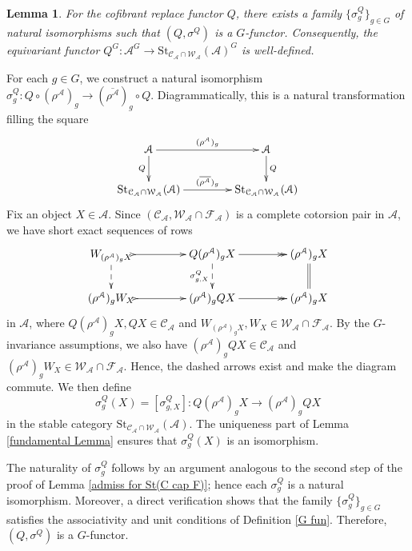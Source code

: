 \documentclass[12pt,twoside]{amsart}
\theoremstyle{bfupright head,slanted body}
\theoremstyle{bfupright head,upright body}
\theoremstyle{fixed bf head,slanted body}
\newtheorem{lem}[res]{Lemma}            \newtheorem*{lem*}{Lemma}
\theoremstyle{fixed bf head,upright body}
\theoremstyle{numbered paragraph}
\newenvironment{prf*}[1][Proof]{%
  \begin{proof}[\bf #1]
    \setcounter{equation}{0}
    \renewcommand{\theequation}{\arabic{equation}}}
  {\end{proof}
}
\numberwithin{equation}{res}
\newcommand{\calC}{\mathcal{C}}
\newcommand{\calW}{\mathcal{W}}
\newcommand{\calF}{\mathcal{F}}
\newcommand{\calA}{\mathcal{A}}
\newcommand{\St}{\mathrm{St}}
\begin{document}
\begin{lem} \label{G-functor Q}
For the cofibrant replace functor $Q$, there exists a family \(\{\sigma_g^Q\}_{g\in G}\) of natural isomorphisms such that \((Q,\sigma^Q)\) is a \(G\)-functor. Consequently, the equivariant functor
\(
Q^G:\calA^G \rightarrow \St_{\calC_\calA \cap \calW_\calA}(\calA)^G
\)
is well-defined.
\end{lem}

\begin{prf*}
For each \(g\in G\), we construct a natural isomorphism
\(
\sigma^Q_g : Q\circ(\rho^\calA)_g \rightarrow (\overline{\rho^\calA})_g\circ Q.
\)
Diagrammatically, this is a natural transformation filling the square
\[
\xymatrix@C=1.5CM@R=0.75CM{
   \calA
\ar[d]_-{Q}
\ar[r]^-{(\rho^\calA)_g}
&  \calA
\ar[d]^-{Q}             \\
   \St_{\calC_\calA \cap \calW_\calA}(\calA)
\ar[r]^-{(\overline{\rho^\calA})_g}
&  \St_{\calC_\calA \cap \calW_\calA}(\calA)                         }
\]
Fix an object $X \in \calA$.
Since $(\calC_\calA, \calW_\calA \cap \calF_\calA)$ is a complete cotorsion pair in $\calA$, we have short exact sequences of rows
\[
\xymatrix@C=1.5CM@R=0.75CM{
   W_{(\rho^\calA)_g X}
\ar@{-->}[d]
\ar@{>->}[r]
&  Q(\rho^\calA)_g X
\ar@{-->}[d]_-{\sigma^Q_{g, X}}
\ar@{->>}[r]
&  (\rho^\calA)_g X
\ar@{=}[d]                       \\
   (\rho^\calA)_g W_X
\ar@{>->}[r]
&  (\rho^\calA)_g QX
\ar@{->>}[r]
&  (\rho^\calA)_g X                               }
\]
in $\calA$, where $Q(\rho^\calA)_g X, QX \in \calC_\calA$ and $W_{(\rho^\calA)_g X}, W_X\in \calW_\calA \cap \calF_\calA$.
By the \(G\)-invariance assumptions, we also have \((\rho^\calA)_g QX\in\calC_\calA\) and \((\rho^\calA)_g W_X\in\calW_\calA\cap\calF_\calA\).
Hence, the dashed arrows exist and make the diagram commute.
We then define
\[
\sigma^Q_g(X)=[\sigma^Q_{g,X}] :
Q(\rho^\calA)_g X \longrightarrow (\rho^\calA)_g QX
\]
in the stable category \(\St_{\calC_\calA\cap\calW_\calA}(\calA)\). The uniqueness part of Lemma \ref{fundamental Lemma} ensures that \(\sigma^Q_g(X)\) is an isomorphism.

The naturality of \(\sigma^Q_g\) follows by an argument analogous to the second step of the proof of Lemma \ref{admiss for St(C cap F)}; hence each \(\sigma^Q_g\) is a natural isomorphism. Moreover, a direct verification shows that the family \(\{\sigma^Q_g\}_{g\in G}\) satisfies the associativity and unit conditions of Definition \ref{G fun}. Therefore, \((Q,\sigma^Q)\) is a \(G\)-functor.
\end{prf*}
\end{document}
